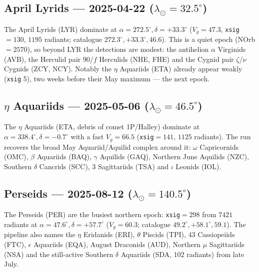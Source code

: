 \documentclass[11pt]{article}
\begin{document}

\subsection{April Lyrids --- 2025-04-22 ($\lambda_\odot=32.5^\circ$)}
The April Lyrids (LYR) dominate at $\alpha=272.5^\circ,\delta=+33.3^\circ$
($V_g=47.3$, \texttt{xsig}${}=130$, $1195$ radiants; catalogue $272.3^\circ,
+33.3^\circ, 46.6$). This is a quiet epoch (NOrb${}=2570$), so beyond LYR the
detections are modest: the antihelion $\alpha$ Virginids (AVB), the Herculid pair
90/$f$ Herculids (NHE, FHE) and the Cygnid pair $\zeta$/$\nu$ Cygnids (ZCY, NCY).
Notably the $\eta$ Aquariids (ETA) already appear weakly (\texttt{xsig} 5),
two weeks before their May maximum --- the next epoch.


\subsection{$\eta$ Aquariids --- 2025-05-06 ($\lambda_\odot=46.5^\circ$)}
The $\eta$ Aquariids (ETA, debris of comet 1P/Halley) dominate at
$\alpha=338.4^\circ,\delta=-0.7^\circ$ with a fast $V_g=66.5$
(\texttt{xsig}${}=141$, $1125$ radiants). The run recovers the broad May
Aquariid/Aquilid complex around it: $\omega$ Capricornids (OMC), $\beta$
Aquariids (BAQ), $\gamma$ Aquilids (GAQ), Northern June Aquilids (NZC), Southern
$\delta$ Cancrids (SCC), 3 Sagittariids (TSA) and $\iota$ Leonids (IOL).


\subsection{Perseids --- 2025-08-12 ($\lambda_\odot=140.5^\circ$)}
The Perseids (PER) are the busiest northern epoch: \texttt{xsig}${}=298$ from
$7421$ radiants at $\alpha=47.6^\circ,\delta=+57.7^\circ$ ($V_g=60.3$; catalogue
$49.2^\circ, +58.1^\circ, 59.1$). The pipeline also names the $\eta$ Eridanids
(ERI), $\theta$ Piscids (TPI), 43 Cassiopeiids (FTC), $\epsilon$ Aquariids (EQA),
August Draconids (AUD), Northern $\mu$ Sagittariids (NSA) and the
still-active Southern $\delta$ Aquariids (SDA, 102 radiants) from late July.
\end{document}
